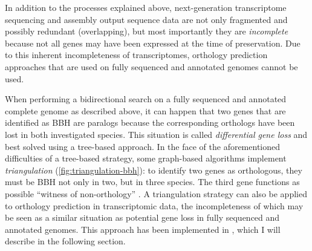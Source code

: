 In addition to the processes explained above, next-generation transcriptome
sequencing and assembly output sequence data are not only fragmented and
possibly redundant (overlapping), but most importantly they are
\emph{incomplete} because not all genes may have been expressed at the time of
preservation. Due to this inherent incompleteness of transcriptomes, orthology
prediction approaches that are used on fully sequenced and annotated genomes
cannot be used.



When performing a bidirectional search on a fully sequenced and annotated
complete genome as described above, it can happen that two genes that are
identified as BBH are paralogs because the corresponding orthologs have been
lost in both investigated species. This situation is called \emph{differential
gene loss}\cite{altenhoff2012} and best solved using a tree-based approach. In
the face of the aforementioned difficulties of a tree-based strategy, some
graph-based algorithms implement \emph{triangulation}
(\autoref{fig:triangulation-bbh}): to identify two genes as orthologous, they
must be BBH not only in two, but in three species. The third gene functions as
possible ``witness of non-orthology'' \citep{dessimoz2006}. A triangulation
strategy can also be applied to orthology prediction in transcriptomic data, the
incompleteness of which may be seen as a similar situation as potential gene
loss in fully sequenced and annotated genomes. This approach has been
implemented in \hamstr \citep{ebersberger2009}, which I will describe in the
following section.
